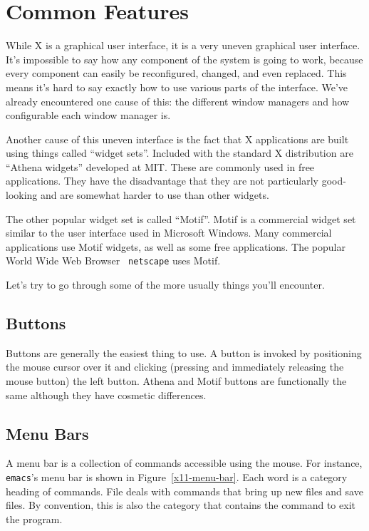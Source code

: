 \section{Common Features}

While X is a graphical user interface, it is a very uneven graphical
user interface.  It's impossible to say how any component of the
system is going to work, because every component can easily be
reconfigured, changed, and even replaced. This means it's hard to say
exactly how to use various parts of the interface.  We've already
encountered one cause of this: the different window managers and how
configurable each window manager is.

Another cause of this uneven interface is the fact that X applications
are built using things called ``widget sets''.  Included with the
standard X distribution are ``Athena widgets'' developed at MIT.
These are commonly used in free applications.  They have the
disadvantage that they are not particularly good-looking and are
somewhat harder to use than other widgets.

The other popular widget set is called 
``Motif''. Motif is a
commercial widget set similar to the user interface used in Microsoft
Windows.  Many commercial applications use Motif widgets, as well as
some free applications.  The popular World Wide Web Browser {\tt
  netscape} uses Motif.

Let's try to go through some of the more usually things you'll
encounter.

\subsection{Buttons}

Buttons are generally the easiest thing to use.  A button is invoked
by positioning the mouse cursor over it and clicking (pressing and
immediately releasing the mouse button) the left button.  Athena and
Motif buttons are functionally the same although they have cosmetic
differences.

\subsection{Menu Bars}

A menu bar is a collection of commands accessible using the mouse.
For instance, {\tt emacs}'s menu bar is shown in
Figure~\ref{x11-menu-bar}.  Each word is a category heading of
commands.  {\sf File} deals with commands that bring up new files and
save files.  By convention, this is also the category that contains
the command to exit the program.

